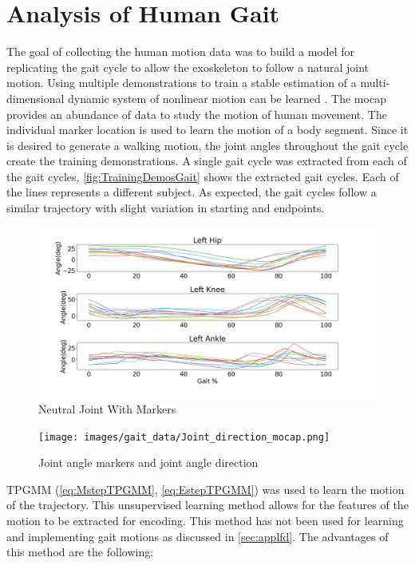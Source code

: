 \section{Analysis of Human Gait}

The goal of collecting the human motion data was to build a model for replicating the gait cycle to allow the exoskeleton to follow a natural joint motion. Using multiple demonstrations to train a stable estimation of a multi-dimensional dynamic system of nonlinear motion can be learned \cite{li2018development}. The mocap provides an abundance of data to study the motion of human movement. The individual marker location is used to learn the motion of a body segment. Since it is desired to generate a walking motion, the joint angles throughout the gait cycle create the training demonstrations.  A single gait cycle was extracted from each of the gait cycles,  \autoref{fig:TrainingDemosGait} shows the extracted gait cycles. Each of the lines represents a different subject. As expected, the gait cycles follow a similar trajectory with slight variation in starting and endpoints. 

\begin{figure}[h]
    \centering
    \includegraphics[scale=0.30]{images/gait_data/gaittraining.png}
    \caption[Neutral Joint With Markers]{Neutral Joint With Markers}
    \label{fig:TrainingDemosGait}
\end{figure}

\begin{figure}[h]
    \centering
    \texttt{[image: images/gait\_data/Joint\_direction\_mocap.png]}
    \caption[Gait Training Demos]{Joint angle markers and joint angle direction}
    \label{fig:TrainingJointPosition}
\end{figure}

TPGMM (\autoref{eq:MstepTPGMM}, \autoref{eq:EstepTPGMM}) was used to learn the motion of the trajectory. This unsupervised learning method allows for the features of the motion to be extracted for encoding. This method has not been used for learning and implementing gait motions as discussed in \autoref{sec:applfd}.  The advantages of this method are the following:

